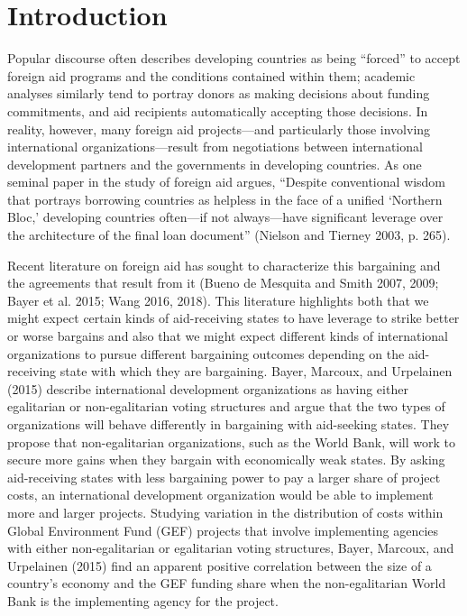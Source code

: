 \documentclass{article}
\begin{document}
\section{Introduction}
Popular discourse often describes developing countries as being “forced” to accept foreign aid programs and the conditions contained within them; academic analyses similarly tend to portray donors as making decisions about funding commitments, and aid recipients automatically accepting those decisions.  In reality, however, many foreign aid projects---and particularly those involving international organizations---result from negotiations between international development partners and the governments in developing countries.  As one seminal paper in the study of foreign aid argues, “Despite conventional wisdom that portrays borrowing countries as helpless in the face of a unified ‘Northern Bloc,’ developing countries often---if not always---have significant leverage over the architecture of the final loan document” (Nielson and Tierney 2003, p. 265).

Recent literature on foreign aid has sought to characterize this bargaining and the agreements that result from it (Bueno de Mesquita and Smith 2007, 2009; Bayer et al. 2015; Wang 2016, 2018).  This literature highlights both that we might expect certain kinds of aid-receiving states to have leverage to strike better or worse bargains and also that we might expect different kinds of international organizations to pursue different bargaining outcomes depending on the aid-receiving state with which they are bargaining.
Bayer, Marcoux, and Urpelainen (2015) describe international development organizations as having either egalitarian or non-egalitarian voting structures and argue that the two types of organizations will behave differently in bargaining with aid-seeking states.  They propose that non-egalitarian organizations, such as the World Bank, will work to secure more gains when they bargain with economically weak states.  By asking aid-receiving states with less bargaining power to pay a larger share of project costs, an international development organization would be able to implement more and larger projects.  Studying variation in the distribution of costs within Global Environment Fund (GEF) projects that involve implementing agencies with either non-egalitarian or egalitarian voting structures, Bayer, Marcoux, and Urpelainen (2015) find an apparent positive correlation between the size of a country’s economy and the GEF funding share when the non-egalitarian World Bank is the implementing agency for the project.   
\end{document}

